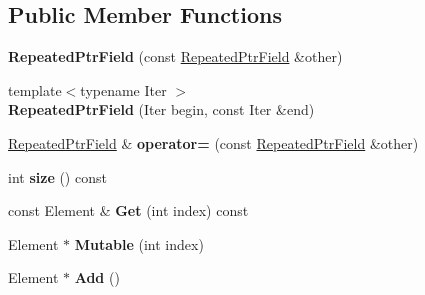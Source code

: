 \subsection*{Public Member Functions}
\begin{DoxyCompactItemize}
\item 
\mbox{\label{classgoogle_1_1protobuf_1_1RepeatedPtrField_acabd7ecc0ca6490c2098442b4c8cd221}} 
{\bfseries Repeated\+Ptr\+Field} (const \hyperlink{classgoogle_1_1protobuf_1_1RepeatedPtrField}{Repeated\+Ptr\+Field} \&other)
\item 
\mbox{\label{classgoogle_1_1protobuf_1_1RepeatedPtrField_ae4684fdf6668d68cf3db2962f73f7fe3}} 
{\footnotesize template$<$typename Iter $>$ }\\{\bfseries Repeated\+Ptr\+Field} (Iter begin, const Iter \&end)
\item 
\mbox{\label{classgoogle_1_1protobuf_1_1RepeatedPtrField_aad1349fe0ee777a491abaf549203aa26}} 
\hyperlink{classgoogle_1_1protobuf_1_1RepeatedPtrField}{Repeated\+Ptr\+Field} \& {\bfseries operator=} (const \hyperlink{classgoogle_1_1protobuf_1_1RepeatedPtrField}{Repeated\+Ptr\+Field} \&other)
\item 
\mbox{\label{classgoogle_1_1protobuf_1_1RepeatedPtrField_a993488dd4235b0c156044b8b3d478985}} 
int {\bfseries size} () const
\item 
\mbox{\label{classgoogle_1_1protobuf_1_1RepeatedPtrField_ae82e20807bfb91ae3380fc2bd093a3a0}} 
const Element \& {\bfseries Get} (int index) const
\item 
\mbox{\label{classgoogle_1_1protobuf_1_1RepeatedPtrField_aa9d47a417e4a8b6c7f354471f546bc19}} 
Element $\ast$ {\bfseries Mutable} (int index)
\item 
\mbox{\label{classgoogle_1_1protobuf_1_1RepeatedPtrField_ac4bb6711065ab0c8719f553f00786e19}} 
Element $\ast$ {\bfseries Add} ()
\item 
\mbox{\label{classgoogle_1_1protobuf_1_1RepeatedPtrField_a7af03bb7e4880acd4c829dd120057c3a}} 

\end{DoxyCompactItemize}
